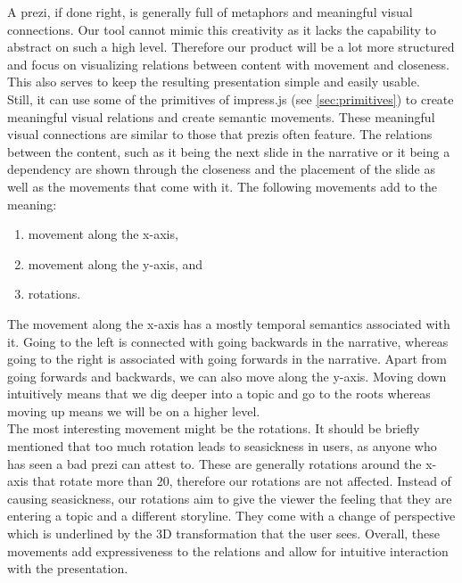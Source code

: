\documentclass[twoside, 12pt]{article}
\begin{document}
A prezi, if done right, is generally full of metaphors and meaningful visual connections. Our tool cannot mimic this creativity as it lacks the capability to abstract on such a high level. Therefore our product will be a lot more structured and focus on visualizing relations between content with movement and closeness. This also serves to keep the resulting presentation simple and easily usable.\\

Still, it can use some of the primitives of impress.js (see \autoref{sec:primitives}) to create meaningful visual relations and create semantic movements. These meaningful visual connections are similar to those that prezis often feature. The relations between the content, such as it being the next slide in the narrative or it being a dependency are shown through the closeness and the placement of the slide as well as the movements that come with it. The following movements add to the meaning:\\
\vspace{-12pt}
\begin{enumerate}[topsep=0pt,itemsep=-1ex,partopsep=1ex,parsep=1ex]
\item movement along the x-axis,
\item movement along the y-axis, and
\item rotations.
\end{enumerate}
\vspace{5pt}

The movement along the x-axis has a mostly temporal semantics associated with it. Going to the left is connected with going backwards in the narrative, whereas going to the right is associated with going forwards in the narrative. Apart from going forwards and backwards, we can also move along the y-axis. Moving down intuitively means that we dig deeper into a topic and go to the roots whereas moving up means we will be on a higher level.\\

The most interesting movement might be the rotations. It should be briefly mentioned that too much rotation leads to seasickness in users, as anyone who has seen a bad prezi can attest to. These are generally rotations around the x-axis that rotate more than 20\degree, therefore our rotations are not affected. Instead of causing seasickness, our rotations aim to give the viewer the feeling that they are entering a topic and a different storyline. They come with a change of perspective which is underlined by the 3D transformation that the user sees. Overall, these movements add expressiveness to the relations and allow for intuitive interaction with the presentation.\\
\end{document}
